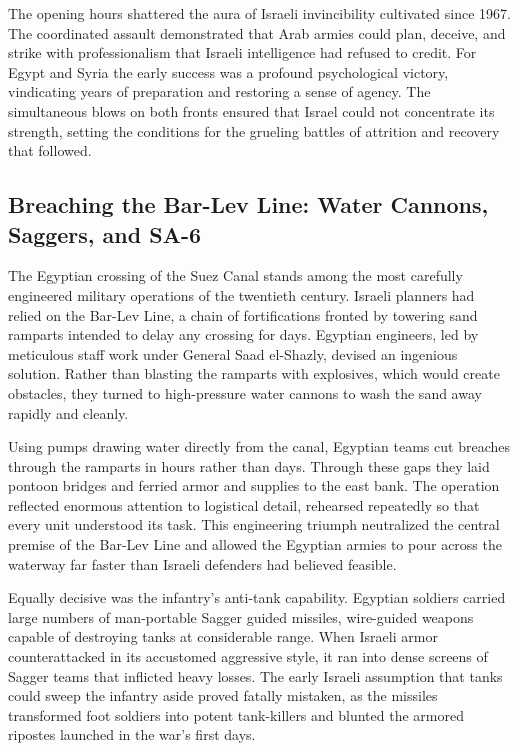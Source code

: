 The opening hours shattered the aura of Israeli invincibility cultivated since 1967. The coordinated assault demonstrated that Arab armies could plan, deceive, and strike with professionalism that Israeli intelligence had refused to credit. For Egypt and Syria the early success was a profound psychological victory, vindicating years of preparation and restoring a sense of agency. The simultaneous blows on both fronts ensured that Israel could not concentrate its strength, setting the conditions for the grueling battles of attrition and recovery that followed. \cite{rabinovich2004} \cite{herzog1975} \cite{shazly1980}

\subsection{Breaching the Bar-Lev Line: Water Cannons, Saggers, and SA-6}
The Egyptian crossing of the Suez Canal stands among the most carefully engineered military operations of the twentieth century. Israeli planners had relied on the Bar-Lev Line, a chain of fortifications fronted by towering sand ramparts intended to delay any crossing for days. Egyptian engineers, led by meticulous staff work under General Saad el-Shazly, devised an ingenious solution. Rather than blasting the ramparts with explosives, which would create obstacles, they turned to high-pressure water cannons to wash the sand away rapidly and cleanly.

Using pumps drawing water directly from the canal, Egyptian teams cut breaches through the ramparts in hours rather than days. Through these gaps they laid pontoon bridges and ferried armor and supplies to the east bank. The operation reflected enormous attention to logistical detail, rehearsed repeatedly so that every unit understood its task. This engineering triumph neutralized the central premise of the Bar-Lev Line and allowed the Egyptian armies to pour across the waterway far faster than Israeli defenders had believed feasible.

Equally decisive was the infantry's anti-tank capability. Egyptian soldiers carried large numbers of man-portable Sagger guided missiles, wire-guided weapons capable of destroying tanks at considerable range. When Israeli armor counterattacked in its accustomed aggressive style, it ran into dense screens of Sagger teams that inflicted heavy losses. The early Israeli assumption that tanks could sweep the infantry aside proved fatally mistaken, as the missiles transformed foot soldiers into potent tank-killers and blunted the armored ripostes launched in the war's first days.

